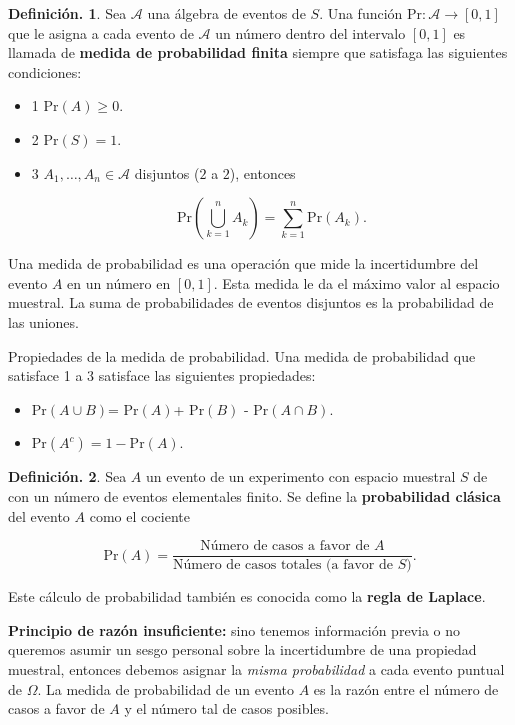 \documentclass[]{book}
\providecommand{\tightlist}{%
  \setlength{\itemsep}{0pt}\setlength{\parskip}{0pt}}
\theoremstyle{definition}
\newtheorem{definition}{Definición.}[chapter]
\theoremstyle{definition}
\theoremstyle{definition}
\theoremstyle{remark}
\begin{document}
\begin{definition}
\protect\hypertarget{def:unnamed-chunk-120}{}{\label{def:unnamed-chunk-120} }
Sea \(\mathcal{A}\) una álgebra de eventos de \(S\). Una función \(\mbox{Pr}: \mathcal{A}\to [0,1]\) que le asigna a cada evento de \(\mathcal{A}\) un
número dentro del intervalo \([0,1]\) es llamada de \textbf{medida de
probabilidad finita} siempre que satisfaga las siguientes condiciones:

\begin{itemize}
\item
  1 \(\mbox{Pr}(A)\geq 0\).
\item
  2 \(\mbox{Pr}(S) =1\).
\item
  3 \(A_1,\ldots, A_n\in \mathcal{A}\) disjuntos (\(2\) a \(2\)), entonces

  \[ \mbox{Pr}\left(\bigcup_{k=1}^{n} A_k \right)=
  \sum_{k=1}^{n}\mbox{Pr}(A_k). \]
\end{itemize}
\end{definition}

Una medida de probabilidad es una operación que mide la incertidumbre del
evento \(A\) en un número en \([0,1]\). Esta medida le da el máximo valor
al espacio muestral. La suma de probabilidades de eventos disjuntos es la
probabilidad de las uniones.

Propiedades de la medida de probabilidad. Una medida de probabilidad que
satisface 1 a 3 satisface las siguientes propiedades:

\begin{itemize}
\tightlist
\item
  Pr\((A \cup B)\)= Pr\((A)\)+ \(\mbox{Pr}(B)\) - Pr\((A\cap B)\).
\item
  Pr\((A^c)= 1-\mbox{Pr}(A)\).
\end{itemize}

\begin{definition}
\protect\hypertarget{def:unnamed-chunk-121}{}{\label{def:unnamed-chunk-121} }
Sea \(A\) un evento de un experimento con espacio muestral \(S\) de
con un número de eventos elementales finito. Se define la \textbf{probabilidad
clásica} del evento \(A\) como
el cociente

\[\mbox{Pr}(A)=\frac{ \mbox{Número de casos a favor de } A}{ \mbox{Número
  de casos totales (a favor de $S$)}}.\]

Este cálculo de probabilidad también es conocida como la \textbf{regla de
Laplace}.
\end{definition}

\textbf{Principio de razón insuficiente:} sino tenemos información previa o no
queremos asumir un sesgo personal sobre la incertidumbre de una propiedad
muestral, entonces debemos asignar la \emph{misma probabilidad} a cada evento
puntual de \(\Omega\). La medida de probabilidad de un evento \(A\) es la razón
entre el número de casos a favor de \(A\) y el número tal de casos posibles.
\end{document}
